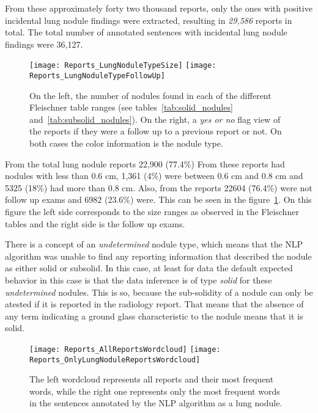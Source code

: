 From these approximately forty two thousand reports, only the ones with positive incidental lung nodule findings were extracted, resulting in \emph{29,586} reports in total. The total number of annotated sentences with incidental lung nodule findings were 36,127. 

\begin{center}
\begin{figure}
\begin{centering}
\texttt{[image: Reports\_LungNoduleTypeSize]}
\texttt{[image: Reports\_LungNoduleTypeFollowUp]}
\end{centering}
\caption{\label{fig:reports_nodules}On the left, the number of nodules found in each of the different Fleischner table ranges (see tables~\ref{tab:solid_nodules} and~\ref{tab:subsolid_nodules}). On the right, a \emph{yes or no} flag view of the reports if they were a follow up to a previous report or not. On both cases the color information is the nodule type.}
\end{figure}
\vspace*{-44pt}
\end{center}

From the total lung nodule reports 22,900 (77.4\%) From these reports had nodules with less than 0.6 cm, 1,361 (4\%) were between 0.6 cm and 0.8 cm and 5325 (18\%) had more than 0.8 cm. Also, from the reports 22604 (76.4\%) were not follow up exams and 6982 (23.6\%) were. This can be seen in the figure~\ref{fig:reports_nodules}. On this figure the left side corresponds to the size ranges as observed in the Fleischner tables and the right side is the follow up exams. 

There is a concept of an \emph{undetermined} nodule type, which means that the NLP algorithm was unable to find any reporting information that described the nodule as either solid or subsolid. In this case, at least for \nomeHslShort{} data the default expected behavior in this case is that the data inference is of type \emph{solid} for these \emph{undetermined} nodules. This is so, because the sub-solidity of a nodule can only be atested if it is reported in the radiology report. That means that the absence of any term indicating a ground glass characteristic to the nodule means that it is solid.

\begin{center}
\begin{figure}
\begin{centering}
\texttt{[image: Reports\_AllReportsWordcloud]}
\texttt{[image: Reports\_OnlyLungNoduleReportsWordcloud]}
\end{centering}
\caption{\label{fig:wordclouds}The left wordcloud represents all reports and their most frequent words, while the right one represents only the most frequent words in the sentences annotated by the NLP algorithm as a lung nodule.}
\end{figure}
\vspace*{-44pt}
\end{center}

